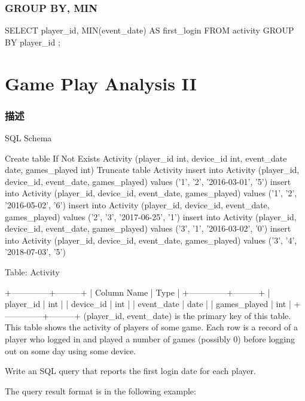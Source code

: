 \subsubsection{GROUP BY, MIN}
\begin{Code}
SELECT
    player_id,
    MIN(event_date) AS first_login
FROM
    activity
GROUP BY
    player_id
;
\end{Code}

\section{Game Play Analysis II} %
\label{sec:game-play-analysis-ii}


\subsubsection{描述}
SQL Schema

\begin{Code}
Create table If Not Exists Activity (player_id int, device_id int, event_date date, games_played int)
Truncate table Activity
insert into Activity (player_id, device_id, event_date, games_played) values ('1', '2', '2016-03-01', '5')
insert into Activity (player_id, device_id, event_date, games_played) values ('1', '2', '2016-05-02', '6')
insert into Activity (player_id, device_id, event_date, games_played) values ('2', '3', '2017-06-25', '1')
insert into Activity (player_id, device_id, event_date, games_played) values ('3', '1', '2016-03-02', '0')
insert into Activity (player_id, device_id, event_date, games_played) values ('3', '4', '2018-07-03', '5')
\end{Code}

Table: Activity

\begin{Code}
+--------------+---------+
| Column Name  | Type    |
+--------------+---------+
| player_id    | int     |
| device_id    | int     |
| event_date   | date    |
| games_played | int     |
+--------------+---------+
(player_id, event_date) is the primary key of this table.
This table shows the activity of players of some game.
Each row is a record of a player who logged in and played a number of games (possibly 0) before logging out on some day using some device.
\end{Code}

Write an SQL query that reports the first login date for each player.

The query result format is in the following example:

